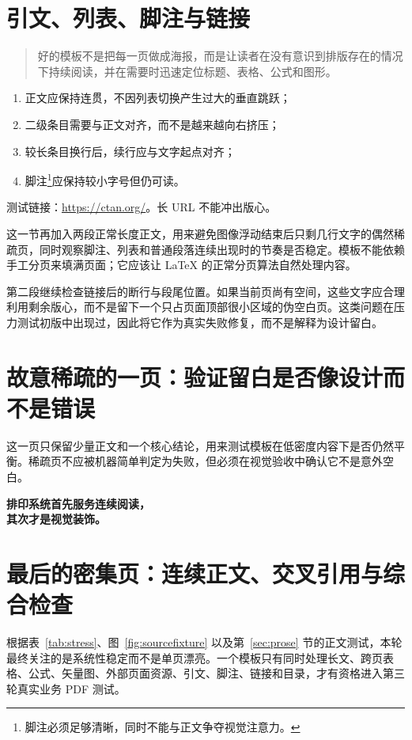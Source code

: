 \section{引文、列表、脚注与链接}
\begin{quote}
好的模板不是把每一页做成海报，而是让读者在没有意识到排版存在的情况下持续阅读，并在需要时迅速定位标题、表格、公式和图形。
\end{quote}
\begin{enumerate}[label=\arabic*.,leftmargin=2.2em,itemsep=.35em]
  \item 正文应保持连贯，不因列表切换产生过大的垂直跳跃；
  \item 二级条目需要与正文对齐，而不是越来越向右挤压；
  \item 较长条目换行后，续行应与文字起点对齐；
  \item 脚注\footnote{脚注必须足够清晰，同时不能与正文争夺视觉注意力。}应保持较小字号但仍可读。
\end{enumerate}
测试链接：\url{https://ctan.org/}。长 URL 不能冲出版心。

这一节再加入两段正常长度正文，用来避免图像浮动结束后只剩几行文字的偶然稀疏页，同时观察脚注、列表和普通段落连续出现时的节奏是否稳定。模板不能依赖手工分页来填满页面；它应该让 LaTeX 的正常分页算法自然处理内容。

第二段继续检查链接后的断行与段尾位置。如果当前页尚有空间，这些文字应合理利用剩余版心，而不是留下一个只占页面顶部很小区域的伪空白页。这类问题在压力测试初版中出现过，因此将它作为真实失败修复，而不是解释为设计留白。

\clearpage
\section{故意稀疏的一页：验证留白是否像设计而不是错误}
这一页只保留少量正文和一个核心结论，用来测试模板在低密度内容下是否仍然平衡。稀疏页不应被机器简单判定为失败，但必须在视觉验收中确认它不是意外空白。
\vspace{16mm}
\begin{center}
\Large\bfseries 排印系统首先服务连续阅读，\\[1.2ex]
其次才是视觉装饰。
\end{center}
\vspace{18mm}

\clearpage
\section{最后的密集页：连续正文、交叉引用与综合检查}
根据表~\ref{tab:stress}、图~\ref{fig:sourcefixture} 以及第~\ref{sec:prose} 节的正文测试，本轮最终关注的是系统性稳定而不是单页漂亮。一个模板只有同时处理长文、跨页表格、公式、矢量图、外部页面资源、引文、脚注、链接和目录，才有资格进入第三轮真实业务 PDF 测试。

